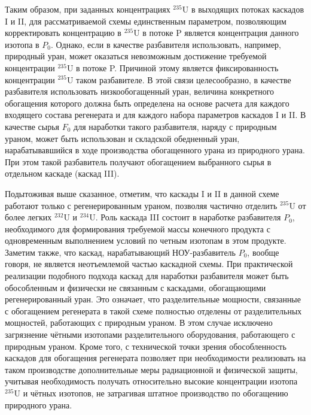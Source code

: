 Таким образом, при заданных концентрациях $^{235}$U в выходящих потоках каскадов I и II, для рассматриваемой схемы единственным параметром, позволяющим корректировать концентрацию в $^{235}$U в потоке P является концентрация данного изотопа в $P_{0}$. Однако, если в качестве разбавителя использовать, например, природный уран, может оказаться невозможным достижение требуемой концентрации $^{235}$U в потоке P. Причиной этому является фиксированность концентрации $^{235}$U таком разбавителе. В этой связи целесообразно, в качестве разбавителя использовать низкообогащенный уран, величина конкретного обогащения которого должна быть определена на основе расчета для каждого входящего состава регенерата и для каждого набора параметров каскадов I и II. В качестве сырья $F_0$ для наработки такого разбавителя, наряду с природным ураном, может быть использован и складской обедненный уран, нарабатывавшийся в ходе производства обогащенного урана из природного урана. При этом такой разбавитель получают обогащением выбранного сырья в отдельном каскаде (каскад III).

Подытоживая выше сказанное, отметим, что каскады I и II в данной схеме работают только с регенерированным ураном, позволяя частично отделить $^{235}$U от более легких $^{232}$U и $^{234}$U. Роль каскада III состоит в наработке разбавителя $P_{0}$, необходимого для формирования требуемой массы конечного продукта с одновременным выполнением условий по четным изотопам в этом продукте. Заметим также, что каскад, нарабатывающий НОУ-разбавитель $P_{0}$, вообще говоря, не является неотъемлемой частью каскадной схемы. При практической реализации подобного подхода каскад для наработки разбавителя может быть обособленным и физически не связанным с каскадами, обогащающими регенерированный уран. Это означает, что разделительные мощности, связанные с обогащением регенерата в такой схеме полностью отделены от разделительных мощностей, работающих с природным ураном. В этом случае исключено загрязнение чётными изотопами разделительного оборудования, работающего с природным ураном. Кроме того, с технической точки зрения обособленность каскадов для обогащения регенерата позволяет при необходимости реализовать на таком производстве дополнительные меры радиационной и физической защиты, учитывая необходимость получать относительно высокие концентрации изотопа $^{235}$U и чётных изотопов, не затрагивая штатное производство по обогащению природного урана.

